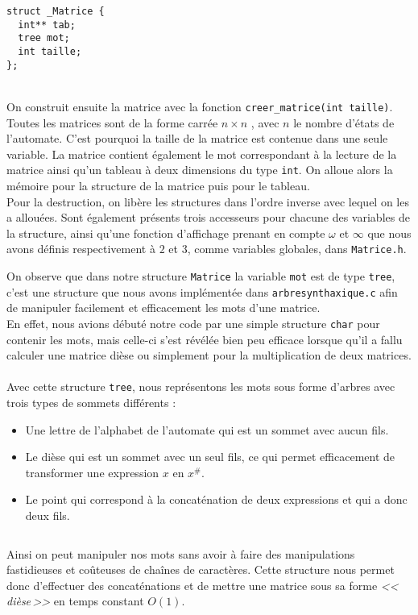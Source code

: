 \documentclass[12pt]{memoir}
\begin{document}
\begin{lstlisting}[frame=single]
struct _Matrice {
  int** tab;
  tree mot;
  int taille;
};
\end{lstlisting}
$ $\\\\
On construit ensuite la matrice avec la fonction \verb?creer_matrice(int taille)?. Toutes les matrices sont de la forme carrée $n \times n$ , avec $n$ le nombre d'états de l'automate. C'est pourquoi la taille de la matrice est contenue dans une seule variable. La matrice contient également le mot correspondant à la lecture de la matrice ainsi qu'un tableau à deux dimensions du type \texttt{int}. On alloue alors la mémoire pour la structure de la matrice puis pour le tableau.\\

Pour la destruction, on libère les structures dans l'ordre inverse avec lequel
on les a allouées. Sont également présents trois accesseurs pour chacune des
variables de la structure, ainsi qu'une fonction d'affichage prenant en compte
$\omega$ et $\infty$ que nous avons définis respectivement à $2$ et $3$, comme
variables globales, dans \texttt{{Matrice.h}}.

On observe que dans notre structure \verb?Matrice? la variable \verb?mot? est
de type \verb?tree?, c'est une structure que nous avons implémentée dans \texttt{{arbresynthaxique.c}} afin de manipuler facilement et efficacement les mots d'une matrice.\\
En effet, nous avions débuté notre code par une simple structure \verb?char? pour contenir les mots, mais celle-ci s'est révélée bien peu efficace lorsque qu'il a fallu calculer une matrice dièse ou simplement pour la multiplication de deux matrices. \\\\
Avec cette structure \verb?tree?, nous représentons les mots sous forme d'arbres avec trois types de sommets différents :
\begin{itemize}
\item Une lettre de l'alphabet de l'automate qui est un sommet avec aucun fils.
\item Le dièse qui est un sommet avec un seul fils, ce qui permet efficacement de transformer une expression $x$ en $x^{\#}$.
\item Le point qui correspond à la concaténation de deux expressions et qui a donc deux fils.
\end{itemize}
$\ $

Ainsi on peut manipuler nos mots sans avoir à faire des manipulations fastidieuses et coûteuses de chaînes de caractères. Cette structure nous permet donc d'effectuer des concaténations et de mettre une matrice sous sa forme \textit{<<\,dièse\,>>} en temps constant $O(1)$.\\
\end{document}
